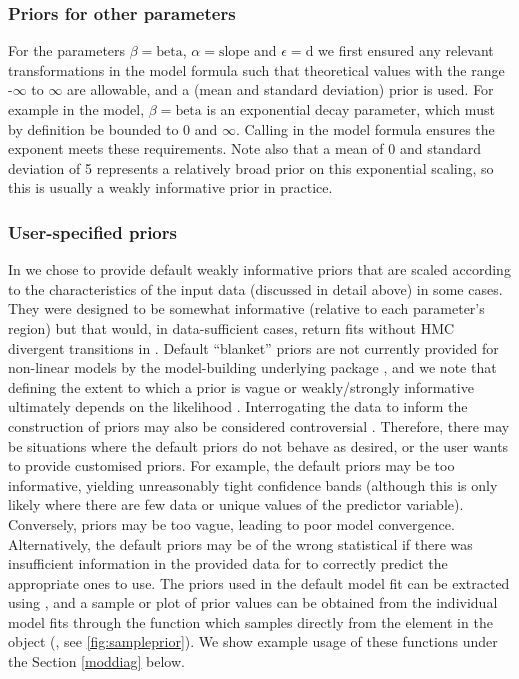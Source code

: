 \documentclass[
  shortnames]{jss}
\begin{document}
\hypertarget{priors-for-other-parameters}{%
\subsubsection{Priors for other parameters}\label{priors-for-other-parameters}}

For the parameters \(\beta = \text{beta}\), \(\alpha = \text{slope}\) and \(\epsilon = \text{d}\) we first ensured any relevant transformations in the model formula such that theoretical values with the range -\(\infty\) to \(\infty\) are allowable, and a  (mean and standard deviation) prior is used. For example in the  model, \(\beta = \text{beta}\) is an exponential decay parameter, which must by definition be bounded to 0 and \(\infty\). Calling  in the model formula ensures the exponent meets these requirements. Note also that a mean of 0 and standard deviation of 5 represents a relatively broad prior on this exponential scaling, so this is usually a weakly informative prior in practice.

\subsubsection[User-specified priors]{User-specified priors}\label{usp}

In  we chose to provide default weakly informative priors that are scaled according to the characteristics of the input data (discussed in detail above) in some cases. They were designed to be somewhat informative (relative to each parameter's region) but that would, in data-sufficient cases, return fits without HMC divergent transitions in . Default ``blanket'' priors are not currently provided for non-linear models by the model-building underlying package , and we note that defining the extent to which a prior is vague or weakly/strongly informative ultimately depends on the likelihood \citep{gelman2017entropy}. Interrogating the data to inform the construction of priors may also be considered controversial \citep{refs}. Therefore, there may be situations where the default  priors do not behave as desired, or the user wants to provide customised priors. For example, the default priors may be too informative, yielding unreasonably tight confidence bands (although this is only likely where there are few data or unique values of the predictor variable). Conversely, priors may be too vague, leading to poor model convergence. Alternatively, the default priors may be of the wrong statistical  if there was insufficient information in the provided data for  to correctly predict the appropriate ones to use. The priors used in the default model fit can be extracted using , and a sample or plot of prior values can be obtained from the individual  model fits through the function  which samples directly from the  element in the  object (, see \autoref{fig:sampleprior}). We show example usage of these functions under the Section \ref{moddiag} below.
\end{document}
